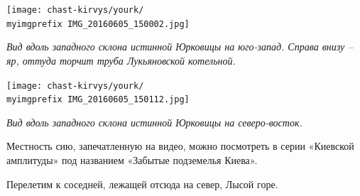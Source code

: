 \begin{center}
\texttt{[image: chast-kirvys/yourk/\\myimgprefix IMG\_20160605\_150002.jpg]}

\textit{Вид вдоль западного склона истинной Юрковицы на юго-запад. Справа внизу – яр, оттуда торчит труба Лукьяновской котельной.}
\end{center}

\newpage

\begin{center}
\texttt{[image: chast-kirvys/yourk/\\myimgprefix IMG\_20160605\_150112.jpg]}

\textit{Вид вдоль западного склона истинной Юрковицы на северо-восток.}
\end{center}






Местность сию, запечатленную на видео, можно посмотреть в серии «Киевской амплитуды» под названием «Забытые подземелья Киева».


Перелетим к соседней, лежащей отсюда на север, Лысой горе.